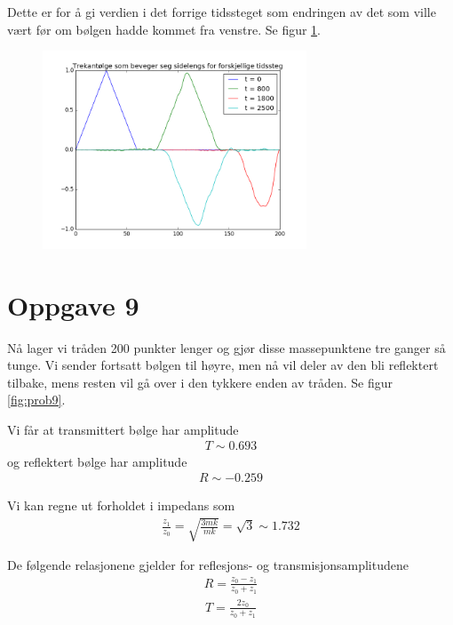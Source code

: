 \documentclass[norsk,a4,12pt,fleqn]{extarticle}
\begin{document}
Dette er for å gi verdien i det forrige tidssteget
som endringen av det som ville vært før om bølgen hadde kommet fra venstre.
Se figur \ref{fig:prob8}.

\begin{figure}[H]
    \label{fig:prob8}
    \centering %
    \includegraphics[width=0.7\textwidth]{../src/problem8.png}
    \caption{} 
\end{figure} 

\section*{Oppgave 9}

Nå lager vi tråden 200 punkter lenger
og gjør disse massepunktene tre ganger så tunge.
Vi sender fortsatt bølgen til høyre, men
nå vil deler av den bli reflektert tilbake,
mens resten vil gå over i den tykkere enden av
tråden. Se figur \ref{fig:prob9}.

Vi får at transmittert bølge har amplitude
\begin{align}
    T \sim 0.693
\end{align}
og reflektert bølge har amplitude
\begin{align}
    R \sim -0.259
\end{align}

Vi kan regne ut forholdet i impedans som
\begin{align}
    \frac{z_1}{z_0} = \sqrt{\frac{{3mk}}{mk}} = \sqrt{3} \sim 1.732
\end{align}

De følgende relasjonene gjelder for
reflesjons- og transmisjonsamplitudene
\begin{align}
    R = \frac{z_0 - z_1}{z_0 + z_1}
\end{align}    
\begin{align}
    T = \frac{2z_0}{z_0 + z_1}
\end{align}
\end{document}
